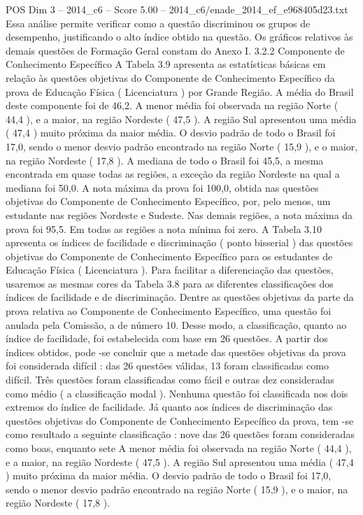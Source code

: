 \begin{textsample}{POS Dim 3 – 2014\_c6 – Score 5.00 – 2014\_c6/enade\_2014\_ef\_e968405d23.txt}
Essa análise permite verificar como a questão discriminou os grupos de desempenho, justificando o alto índice obtido na questão.
Os gráficos relativos às demais questões de Formação Geral constam do Anexo I. 3.2.2 Componente de Conhecimento Específico A Tabela 3.9 apresenta as estatísticas básicas em relação às questões objetivas do Componente de Conhecimento Específico da prova de Educação Física ( Licenciatura ) por Grande Região.
A média do Brasil deste componente foi de 46,2.
A menor média foi observada na região Norte ( 44,4 ), e a maior, na região Nordeste ( 47,5 ).
A região Sul apresentou uma média ( 47,4 ) muito próxima da maior média.
O desvio padrão de todo o Brasil foi 17,0, sendo o menor desvio padrão encontrado na região Norte ( 15,9 ), e o maior, na região Nordeste ( 17,8 ).
A mediana de todo o Brasil foi 45,5, a mesma encontrada em quase todas as regiões, a exceção da região Nordeste na qual a mediana foi 50,0.
A nota máxima da prova foi 100,0, obtida nas questões objetivas do Componente de Conhecimento Específico, por, pelo menos, um estudante nas regiões Nordeste e Sudeste.
Nas demais regiões, a nota máxima da prova foi 95,5.
Em todas as regiões a nota mínima foi zero.
A Tabela 3.10 apresenta os índices de facilidade e discriminação ( ponto bisserial ) das questões objetivas do Componente de Conhecimento Específico para os estudantes de Educação Física ( Licenciatura ).
Para facilitar a diferenciação das questões, usaremos as mesmas cores da Tabela 3.8 para as diferentes classificações dos índices de facilidade e de discriminação.
Dentre as questões objetivas da parte da prova relativa ao Componente de Conhecimento Específico, uma questão foi anulada pela Comissão, a de número 10.
Desse modo, a classificação, quanto ao índice de facilidade, foi estabelecida com base em 26 questões.
A partir dos índices obtidos, pode -se concluir que a metade das questões objetivas da prova foi considerada difícil : das 26 questões válidas, 13 foram classificadas como difícil.
Três questões foram classificadas como fácil e outras dez consideradas como médio ( a classificação modal ).
Nenhuma questão foi classificada nos dois extremos do índice de facilidade.
Já quanto aos índices de discriminação das questões objetivas do Componente de Conhecimento Específico da prova, tem -se como resultado a seguinte classificação : nove das 26 questões foram consideradas como boas, enquanto sete A menor média foi observada na região Norte ( 44,4 ), e a maior, na região Nordeste ( 47,5 ).
A região Sul apresentou uma média ( 47,4 ) muito próxima da maior média.
O desvio padrão de todo o Brasil foi 17,0, sendo o menor desvio padrão encontrado na região Norte ( 15,9 ), e o maior, na região Nordeste ( 17,8 ).

\end{textsample}
